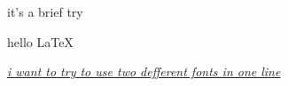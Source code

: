 \documentclass{article}
\begin{document}
    it's a brief try

    hello \LaTeX

    \textit{\underline{i want to try to use two defferent fonts in one line}}
    
\end{document}
